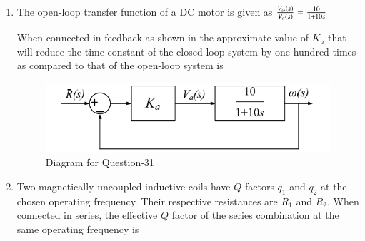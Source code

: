 \documentclass[journal,12pt,onecolumn]{IEEEtran}
\theoremstyle{remark}
\begin{document}
\begin{enumerate}
\item The open-loop transfer function of a DC motor is given as  
$\frac{V_{\omega}\left(s\right)}{V_a\left(s\right)} = \frac{10}{1 + 10s}$

When connected in feedback as shown in  the approximate value of $K_a$ that will reduce the time constant of the closed loop system by one hundred times as compared to that of the open-loop system is  
\par \hfill{}
\begin{figure}[H]
\centering
\includegraphics[width=0.5\columnwidth]{Figs/Q-31.png}
\caption{Diagram for Question-31}
\label{31}
\end{figure}
\begin{enumerate}
\end{enumerate}

\item  Two magnetically uncoupled inductive coils have $Q$ factors $q_1$ and $q_2$ at the chosen operating frequency. Their respective resistances are $R_1$ and $R_2$. When connected in series, the effective $Q$ factor of the series combination at the same operating frequency is \par \hfill{}
\begin{enumerate}
\end{enumerate}


\end{enumerate}
\end{document}
